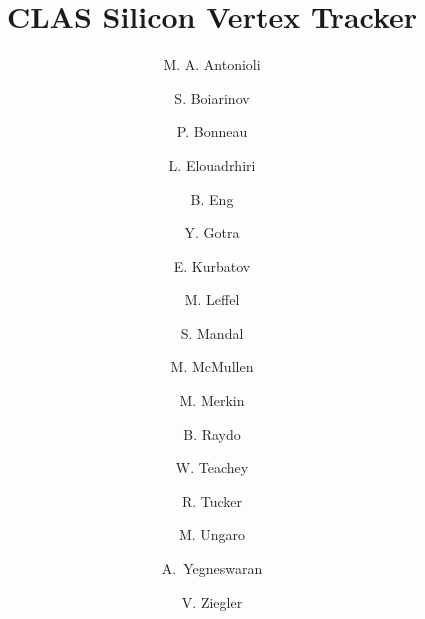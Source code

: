 \title{CLAS Silicon Vertex Tracker}

\author[A]{M. A. Antonioli}
\author[A]{S. Boiarinov}
\author[A]{P. Bonneau}
\author[A]{L. Elouadrhiri}
\author[A]{B. Eng}
\author[A]{Y. Gotra}
\author[B]{E. Kurbatov}
\author[A]{M. Leffel}
\author[A]{S. Mandal}
\author[A]{M. McMullen}
\author[B]{M. Merkin}
\author[A]{B. Raydo}
\author[A]{W. Teachey}
\author[C]{R. Tucker}
\author[A]{M. Ungaro}
\author[A]{A.~Yegneswaran}
\author[A]{V. Ziegler}

\address[A]{Thomas Jefferson National Accelerator Facility, Newport News, VA, USA}
\address[B]{Skobeltsyn Institute of Nuclear Physics, Moscow State University, Moscow, Russia}
\address[C]{Arizona State University, Tempe, AZ}
